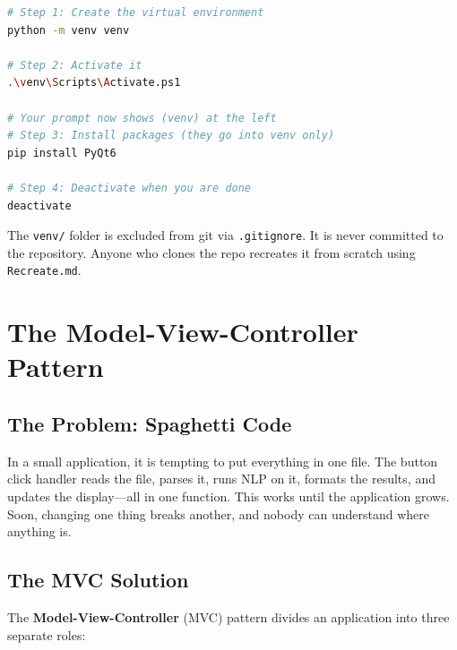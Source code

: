 \documentclass[12pt,oneside]{book}
\begin{document}
\begin{lstlisting}[language=bash, caption={Virtual environment commands}]
# Step 1: Create the virtual environment
python -m venv venv

# Step 2: Activate it
.\venv\Scripts\Activate.ps1

# Your prompt now shows (venv) at the left
# Step 3: Install packages (they go into venv only)
pip install PyQt6

# Step 4: Deactivate when you are done
deactivate
\end{lstlisting}

\begin{notebox}
The \texttt{venv/} folder is excluded from git via \texttt{.gitignore}. It is never
committed to the repository. Anyone who clones the repo recreates it from scratch using
\texttt{Recreate.md}.
\end{notebox}

\chapter{The Model-View-Controller Pattern}
\label{ch:mvc}

\section{The Problem: Spaghetti Code}

In a small application, it is tempting to put everything in one file. The button click
handler reads the file, parses it, runs NLP on it, formats the results, and updates the
display—all in one function. This works until the application grows. Soon, changing one
thing breaks another, and nobody can understand where anything is.

\section{The MVC Solution}

The \textbf{Model-View-Controller} (MVC) pattern divides an application into three
separate roles:
\end{document}

